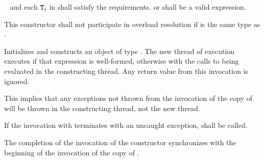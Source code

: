 \begin{itemdescr}
  \pnum
\requires\  and each $\texttt{T}_i$ in  shall satisfy the
 requirements.
{\color{diffcolor}
        or
}
 shall be a valid expression.

\pnum\remarks
This constructor shall not participate in overload resolution if 
is the same type as .

\pnum\effects
{\color{diffcolor} Initializes  and
}
constructs an object of type .
The new thread of execution executes
{\color{diffcolor}
if that expression is well-formed,
otherwise
}
with the calls to
 being evaluated in the constructing thread.
Any return value from this invocation is ignored.
\begin{note} This implies that any exceptions not thrown from the invocation of the copy
of  will be thrown in the constructing thread, not the new thread. \end{note}
If the invocation
with 
terminates with an uncaught exception,  shall be called.

\pnum\sync The completion of the invocation of the constructor
synchronizes with the beginning of the invocation of the copy of .


\end{itemdescr}
